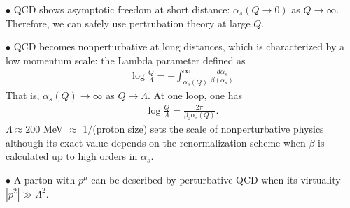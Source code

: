 \documentclass[9pt,a4paper,unknownkeysallowed,xcolor=dvipsnames,aspectratio=43]{beamer}
\begin{document}
\begin{frame}\vspace{2mm}

{\color{darkred}\Large$\bullet$} QCD shows {\color{darkred}asymptotic freedom} at short distance: $\alpha_s(Q\to 0)$ as $Q\to \infty$. Therefore, we can safely use pertrubation theory at large $Q$.
\vspace{2mm}

{\color{darkred}\Large$\bullet$} QCD becomes {\color{darkred}nonperturbative} at long distances, which is characterized by a low momentum scale: {\color{darkred} the Lambda parameter} defined as\\
\begin{align}
\log\frac{Q}{\Lambda}=-\int_{\alpha_s(Q)}^\infty\frac{d\alpha_s}{\beta(\alpha_s)}
\end{align}
That is, $\alpha_s(Q)\to \infty$ as $Q\to \Lambda$. At one loop, one has
\begin{align}
\log\frac{Q}{\Lambda} = \frac{2\pi}{\beta_0 \alpha_s(Q)}.    
\end{align}
$\Lambda\approx 200$ MeV $\approx$ 1/(proton size) sets the scale of {\color{darkred} nonperturbative physics} although its exact value depends on the renormalization scheme when $\beta$ is calculated up to high orders in $\alpha_s$.
\vspace{2mm}

{\color{darkred}\Large$\bullet$} A parton with $p^\mu$ can be described by perturbative QCD when {\color{darkred} its virtuality} $|p^2|\gg \Lambda^2$.
\vspace{2mm}
\end{frame}
%
%
\end{document}
